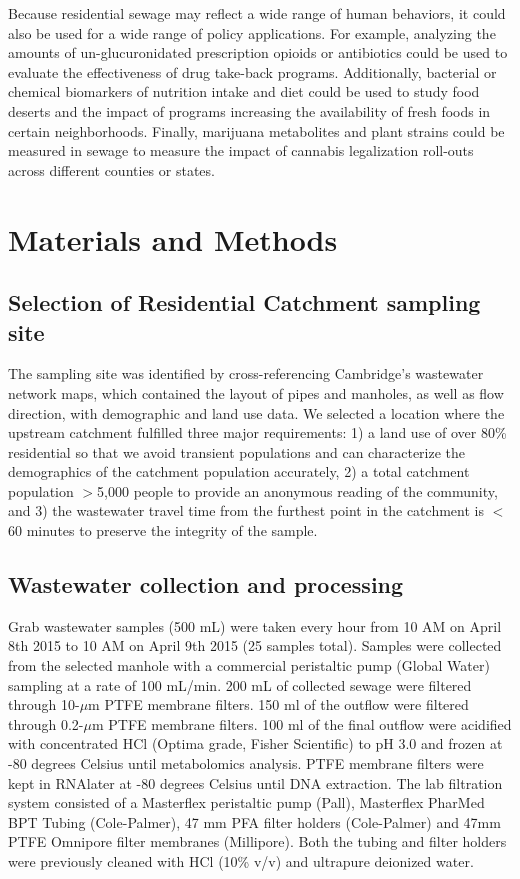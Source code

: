 Because residential sewage may reflect a wide range of human behaviors, it could also be used for a wide range of policy applications. For example, analyzing the amounts of un-glucuronidated prescription opioids or antibiotics could be used to evaluate the effectiveness of drug take-back programs. Additionally, bacterial or chemical biomarkers of nutrition intake and diet could be used to study food deserts and the impact of programs increasing the availability of fresh foods in certain neighborhoods. Finally, marijuana metabolites and plant strains could be measured in sewage to measure the impact of cannabis legalization roll-outs across different counties or states.

\section{Materials and Methods}

\subsection{Selection of Residential Catchment sampling site}

The sampling site was identified by cross-referencing Cambridge's wastewater network maps, which contained the layout of pipes and manholes, as well as flow direction, with demographic and land use data. We selected a location where the upstream catchment fulfilled three major requirements: 1) a land use of over 80\% residential so that we avoid transient populations and can characterize the demographics of the catchment population accurately, 2) a total catchment population $>$5,000 people to provide an anonymous reading of the community, and 3) the wastewater travel time from the furthest point in the catchment is $<$60 minutes to preserve the integrity of the sample.

\subsection{Wastewater collection and processing}

Grab wastewater samples (500 mL) were taken every hour from 10 AM on April 8th 2015 to 10 AM on April 9th 2015 (25 samples total). Samples were collected from the selected manhole with a commercial peristaltic pump (Global Water) sampling at a rate of 100 mL/min. 200 mL of collected sewage were filtered through 10-$\mu$m PTFE membrane filters. 150 ml of the outflow were filtered through 0.2-$\mu$m PTFE membrane filters. 100 ml of the final outflow were acidified with concentrated HCl (Optima grade, Fisher Scientific) to pH 3.0 and frozen at -80 degrees Celsius until metabolomics analysis. PTFE membrane filters were kept in RNAlater at -80 degrees Celsius until DNA extraction. The lab filtration system consisted of a Masterflex peristaltic pump (Pall), Masterflex PharMed BPT Tubing (Cole-Palmer), 47 mm PFA filter holders (Cole-Palmer) and 47mm PTFE Omnipore filter membranes (Millipore). Both the tubing and filter holders were previously cleaned with HCl (10\% v/v) and ultrapure deionized water.

